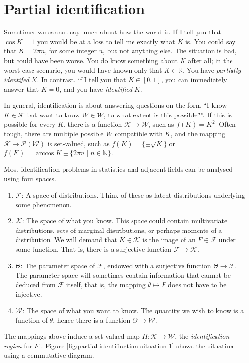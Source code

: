 \section{Partial identification}
\label{sec:partial identification}
Sometimes we cannot say much about how the world is. If I tell you that $\cos K=1$ you would be at a loss to tell me exactly what $K$ is. You could say that $K=2\pi n$, for some integer $n$, but not anything else. The situation is bad, but could have been worse. You do know something about $K$ after all; in the worst case scenario, you would have known only that $K\in\mathbb{R}$. You have \emph{partially identifed} $K$. In contrast, if I tell you that $K\in[0,1]$, you can immediately answer that $K=0$, and you have \emph{identified} $K$.

In general, identification is about answering questions on the form ``I know $K\in\mathcal{K}$ but want to know $W\in\mathcal{W}$, to what extent is this possible?''. If this is possible for every $K$, there is a function $\mathcal{K}\to \mathcal{W}$, such as $f(K)=K^{2}$. Often tough, there are multiple possible $W$ compatible with $K$, and the mapping $\mathcal{K}\to \mathcal{P}(\mathcal{W})$ is set-valued, such as $f(K)=\{\pm\sqrt{K}\}$ or $f(K) = \arccos{K} \pm \{2\pi n\mid n\in \mathbb{N}\}$.

Most identification problems in statistics and adjacent fields can be analysed using four spaces.
\begin{enumerate}
\item $\mathcal{F}$: A space of distributions. Think of these as latent distributions underlying some phenomenon. 
\item $\mathcal{K}$: The space of what you know. This space could contain multivariate distributions, sets of marginal distributions, or perhaps moments of a distribution. We will demand that $K\in\mathcal{K}$ is the image of an $F\in\mathcal{F}$ under some function. That is, there is a surjective function $\mathcal{F}\to\mathcal{K}$. 
\item $\Theta$: The parameter space of $\mathcal{F}$, endowed with a surjective function $\Theta\to\mathcal{F}$. The parameter space will sometimes contain information that cannot be deduced from $\mathcal{F}$ itself, that is, the mapping $\theta\mapsto F$ does not have to be injective. 
\item $\mathcal{W}$: The space of what you want to know. The quantity we wish to know is a function of $\theta$, hence there is a function $\Theta\to\mathcal{W}$. 
\end{enumerate}
The mappings above induce a set-valued map $H:\mathcal{K}\to\mathcal{W}$, the \emph{identification region} for $F$ \parencite{Manski2003-aq}.
Figure \ref{fig:partial identifiaction situation-1} shows the situation using a commutative diagram. 

